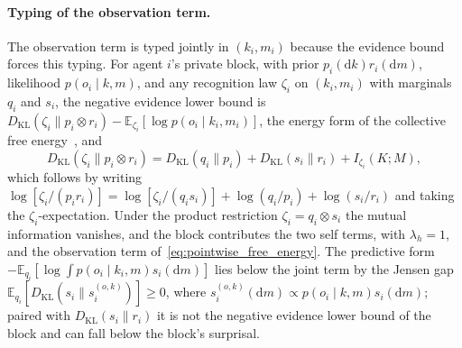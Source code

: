 \paragraph{Typing of the observation term.} The observation term is typed jointly in $(k_i, m_i)$ because the evidence bound forces this typing. For agent $i$'s private block, with prior $p_i(\mathrm{d}k) r_i(\mathrm{d}m)$, likelihood $p(o_i \mid k, m)$, and any recognition law $\zeta_i$ on $(k_i, m_i)$ with marginals $q_i$ and $s_i$, the negative evidence lower bound is $D_{\mathrm{KL}}(\zeta_i \| p_i \otimes r_i) - \mathbb{E}_{\zeta_i}[\log p(o_i \mid k_i, m_i)]$, the energy form of the collective free energy~\cite[Ch.~5]{DennisGaugeVFE2026}, and
\begin{equation}
D_{\mathrm{KL}}(\zeta_i \| p_i \otimes r_i) = D_{\mathrm{KL}}(q_i \| p_i) + D_{\mathrm{KL}}(s_i \| r_i) + I_{\zeta_i}(K; M),
\label{eq:observation_typing_ledger}
\end{equation}
which follows by writing $\log[\zeta_i/(p_i r_i)] = \log[\zeta_i/(q_i s_i)] + \log(q_i/p_i) + \log(s_i/r_i)$ and taking the $\zeta_i$-expectation. Under the product restriction $\zeta_i = q_i \otimes s_i$ the mutual information vanishes, and the block contributes the two self terms, with $\lambda_h = 1$, and the observation term of~\eqref{eq:pointwise_free_energy}. The predictive form $-\mathbb{E}_{q_i}[\log \int p(o_i \mid k_i, m) s_i(\mathrm{d}m)]$ lies below the joint term by the Jensen gap $\mathbb{E}_{q_i}[D_{\mathrm{KL}}(s_i \| s_i^{(o,k)})] \geq 0$, where $s_i^{(o,k)}(\mathrm{d}m) \propto p(o_i \mid k, m) s_i(\mathrm{d}m)$; paired with $D_{\mathrm{KL}}(s_i \| r_i)$ it is not the negative evidence lower bound of the block and can fall below the block's surprisal.

